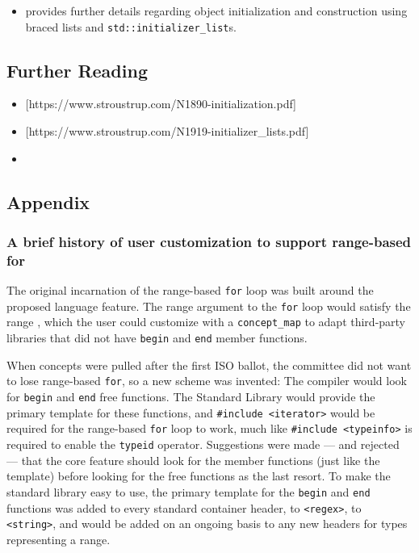 \begin{itemize}
\item{provides further details regarding object initialization and construction using braced lists and \lstinline!std::initializer_list!s.}
\end{itemize}

\subsection[Further Reading]{Further Reading}\label{further-reading}

\begin{itemize}
\item{\cite{stroustrup05a}[https://www.stroustrup.com/N1890-initialization.pdf]}
\item{\cite{stroustrup05a}[https://www.stroustrup.com/N1919-initializer\_lists.pdf]}
\item{\cite{krzemienski16}}
\end{itemize}
    

\subsection[Appendix]{Appendix}\label{appendix-initlist}

\subsubsection[A brief history of user customization to support range-based \lstinline!for!]{A brief history of user customization to support range-based {\SubsubsecCode for}}\label{a-brief-history-of-user-customization-to-support-range-based-for}

The original incarnation of the range-based \lstinline!for! loop was built
around the proposed  language feature. The range
argument to the \lstinline!for! loop would satisfy the range
, which the user could customize with a
\lstinline!concept_map! to adapt third-party libraries that did not have
\lstinline!begin! and \lstinline!end! member functions.

When concepts were pulled after the first ISO ballot, the committee did
not want to lose range-based \lstinline!for!, so a new scheme was invented:
The compiler would look for \lstinline!begin! and \lstinline!end! free
functions. The Standard Library would provide the primary template for
these functions, and \lstinline!#include!~\lstinline!<iterator>! would be
required for the range-based \lstinline!for! loop to work, much like
\lstinline!#include!~\lstinline!<typeinfo>! is required to enable the
\lstinline!typeid! operator. Suggestions were made --- and rejected ---
that the core feature should look for the member functions (just like
the template) before looking for the free functions as the last resort.
To make the standard library easy to use, the primary template for the
\lstinline!begin! and \lstinline!end! functions was added to every standard
container header, to \lstinline!<regex>!, to \lstinline!<string>!, and would
be added on an ongoing basis to any new headers for types representing a
range.

